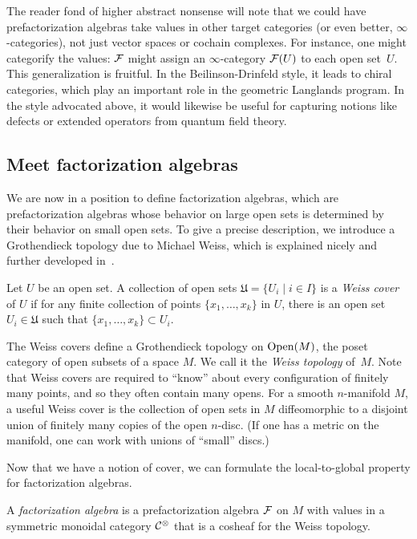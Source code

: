 \documentclass[11pt]{amsart}
\begin{document}
\begin{rmk}
The reader fond of higher abstract nonsense will note that we could have prefactorization algebras take values in other target categories (or even better, $\infty$-categories),
not just vector spaces or cochain complexes.
For instance, one might categorify the values: 
$\mathcal F$ might assign an $\infty$-category $\mathcal F(U)$ to each open set~$U$.
This generalization is fruitful.
In the Beilinson-Drinfeld style, it leads to chiral categories, which play an important role in the geometric Langlands program.
In the style advocated above, it would likewise be useful for capturing notions like defects or extended operators from quantum field theory.
\end{rmk}

\subsection{Meet factorization algebras}

We are now in a position to define factorization algebras,
which are prefactorization algebras whose behavior on large open sets is determined by their behavior on small open sets.
To give a precise description, we introduce a Grothendieck topology due to Michael Weiss, 
which is explained nicely and further developed in~\cite{BoavidaWeiss}.

\begin{dfn}
Let $U$ be an open set. A collection of open sets $\mathfrak{U} = \{ U_i \mid i \in I\}$ is a {\em Weiss cover} of $U$ if for any finite collection of points $\{x_1,\ldots,x_k\}$ in $U$, there is an open set $U_i \in \mathfrak{U}$ such that $\{x_1,\ldots,x_k\} \subset U_i$.
\end{dfn}

The Weiss covers define a Grothendieck topology on $\operatorname{Open}(M)$, the poset category of open subsets of a space $M$. 
We call it the {\em Weiss topology} of~$M$. 
Note that Weiss covers are required to ``know'' about every configuration of finitely many points,
and so they often contain many opens.
For a smooth $n$-manifold $M$, a useful Weiss cover is the collection of open sets in $M$ diffeomorphic to a disjoint union of finitely many copies of the open $n$-disc.
(If one has a metric on the manifold, one can work with unions of ``small'' discs.)

Now that we have a notion of cover, we can formulate the local-to-global property for factorization algebras.

\begin{dfn}
A \emph{factorization algebra} is a prefactorization algebra $\mathcal F$ on $M$ with values in a symmetric monoidal category $\mathcal C^\otimes$ that is a cosheaf for the Weiss topology.
\end{dfn}
\end{document}
